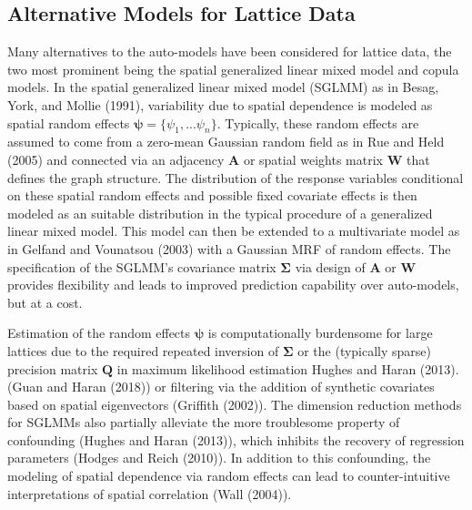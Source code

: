 \documentclass[12pt, a4paper, twoside]{article}
\begin{document}
\subsection{Alternative Models for Lattice Data}
Many alternatives to the auto-models  have been considered for lattice data, the two most prominent being the spatial generalized linear mixed model and copula models. In the spatial generalized linear mixed model (SGLMM) as in Besag, York, and Mollie (1991), variability due to spatial dependence is modeled as spatial random effects $\boldsymbol{\psi} = \lbrace \psi_1,...\psi_n\rbrace$. Typically, these random effects are assumed to come from a zero-mean Gaussian random field as in Rue and Held (2005) and connected via an adjacency $\textbf{A}$ or spatial weights matrix $\textbf{W}$  that defines the graph structure. The distribution of the response variables conditional on these spatial random effects and possible fixed covariate effects is then modeled as an suitable distribution in the typical procedure of a generalized linear mixed model. This model can then be extended to a multivariate model as in Gelfand and Vounatsou (2003) with a Gaussian MRF of random effects. The specification of the SGLMM's covariance matrix $\boldsymbol{\Sigma}$ via design of $\textbf{A}$ or $\textbf{W}$ provides flexibility and leads to improved prediction capability over auto-models, but at a cost.

Estimation of the random effects $\boldsymbol{\psi}$ is computationally burdensome for large lattices due to the required repeated inversion of $\boldsymbol{\Sigma}$ or the (typically sparse) precision matrix $\textbf{Q}$ in maximum likelihood estimation Hughes and Haran (2013). (Guan and Haran (2018)) or filtering via the addition of synthetic covariates based on spatial eigenvectors (Griffith (2002)). The dimension reduction methods for SGLMMs also partially alleviate the more troublesome property of confounding (Hughes and Haran (2013)), which inhibits the recovery of regression parameters (Hodges and Reich (2010)). In addition to this confounding, the modeling of spatial dependence via random effects can lead to counter-intuitive interpretations of spatial correlation (Wall (2004)).  
\end{document}
